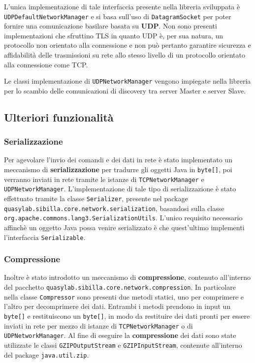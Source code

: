 L'unica implementazione di tale interfaccia presente nella libreria sviluppata è \texttt{UDPDefaultNetworkManager} e si basa sull'uso di \texttt{DatagramSocket} per poter fornire una comunicazione basilare basata su \textbf{UDP}.
Non sono presenti implementazioni che sfruttino TLS in quanto UDP è, per sua natura, un protocollo non orientato alla connessione e non può pertanto garantire sicurezza e affidabilità delle trasmissioni su rete allo stesso livello di un protocollo orientato alla connessione come TCP.

Le classi implementazione di \texttt{UDPNetworkManager} vengono impiegate nella libreria per lo scambio delle comunicazioni di discovery tra server Master e server Slave.


\subsection{Ulteriori funzionalità}

\subsubsection{Serializzazione}

Per agevolare l'invio dei comandi e dei dati in rete è stato implementato un meccanismo di \textbf{serializzazione} per tradurre gli oggetti Java in \texttt{byte[]}, poi verranno inviati in rete tramite le istanze di \texttt{TCPNetworkManager} e \texttt{UDPNetworkManager}. 
L'implementazione di tale tipo di serializzazione è stato effettuato tramite la classe \texttt{Serializer}, presente nel package \texttt{quasylab.sibilla.core.network.serialization}, basandosi sulla classe \texttt{org.apache.commons.lang3.SerializationUtils}.
L'unico requisito necessario affinchè un oggetto Java possa venire serializzato è che quest'ultimo implementi l'interfaccia \texttt{Serializable}.

\subsubsection{Compressione}

Inoltre è stato introdotto un meccanismo di \textbf{compressione}, contenuto all'interno del pacchetto \texttt{quasylab.sibilla.core.network.compression}. In particolare nella classe \texttt{Compressor} sono presenti due metodi statici, uno per comprimere e l'altro per decomprimere dei dati. Entrambi i metodi prendono in input un \texttt{byte[]} e restituiscono un \texttt{byte[]}, in modo da restituire dei dati pronti per essere inviati in rete per mezzo di istanze di \texttt{TCPNetworkManager} o di \texttt{UDPNetworkManager}. Al fine di eseguire la \textbf{compressione} dei dati sono state utilizzate le classi \texttt{GZIPOutputStream} e \texttt{GZIPInputStream}, contenute all'interno del package \texttt{java.util.zip}.


